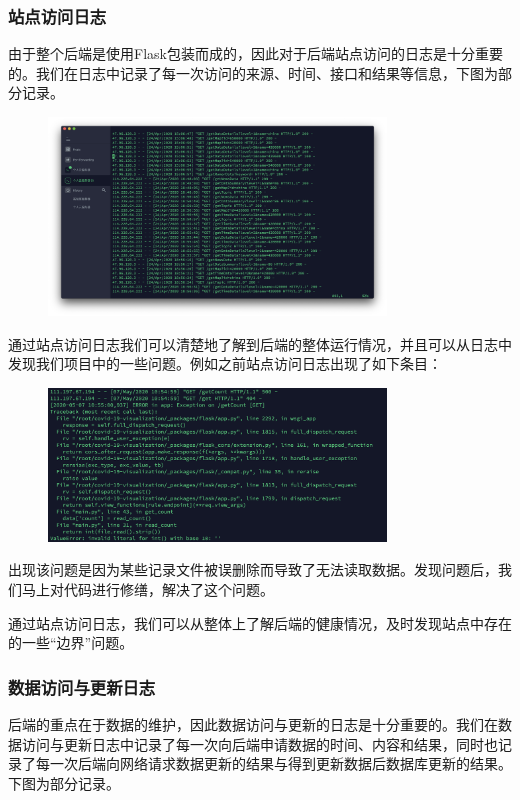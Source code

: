 \documentclass{article}
\begin{document}
\subsubsection{站点访问日志}
由于整个后端是使用Flask包装而成的，因此对于后端站点访问的日志是十分重要的。我们在日志中记录了每一次访问的来源、时间、接口和结果等信息，下图为部分记录。

\begin{figure}[H]
\centering
\includegraphics[width=0.8\textwidth]{pic4.png}
\end{figure}

通过站点访问日志我们可以清楚地了解到后端的整体运行情况，并且可以从日志中发现我们项目中的一些问题。例如之前站点访问日志出现了如下条目：

\begin{figure}[H]
\centering
\includegraphics[width=0.8\textwidth]{pic5.png}
\end{figure}

出现该问题是因为某些记录文件被误删除而导致了无法读取数据。发现问题后，我们马上对代码进行修缮，解决了这个问题。

通过站点访问日志，我们可以从整体上了解后端的健康情况，及时发现站点中存在的一些“边界”问题。

\subsubsection{数据访问与更新日志}
后端的重点在于数据的维护，因此数据访问与更新的日志是十分重要的。我们在数据访问与更新日志中记录了每一次向后端申请数据的时间、内容和结果，同时也记录了每一次后端向网络请求数据更新的结果与得到更新数据后数据库更新的结果。下图为部分记录。
\end{document}
